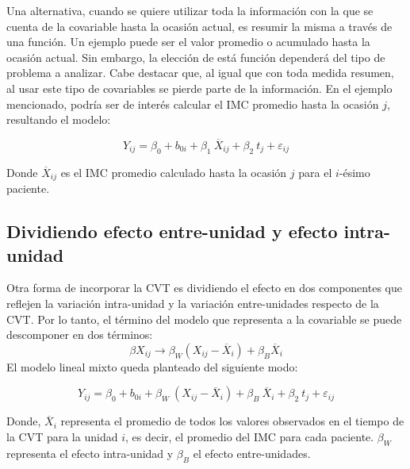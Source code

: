 \documentclass[spanish]{article}
\numberwithin{figure}{subsection}
\numberwithin{equation}{subsection}
\numberwithin{table}{subsection}
\begin{document}
Una alternativa, cuando se quiere utilizar toda la información con la que se
cuenta de la covariable hasta la ocasión actual, es resumir la misma a través de
una función. Un ejemplo puede ser el valor promedio o acumulado hasta la ocasión
actual. Sin embargo, la elección de está función dependerá del tipo de problema
a analizar. Cabe destacar que, al igual que con toda medida resumen, al usar
este tipo de covariables se pierde parte de la información. En el ejemplo
mencionado, podría ser de interés calcular el IMC promedio hasta la ocasión $j$,
resultando el modelo:

\[ Y_{ij} = \beta_0 + b_{0i} + \beta_1\ \overline{X}_{ij} + \beta_2\ t_j + \varepsilon_{ij} \]

Donde $\overline{X}_{ij}$ es el IMC promedio calculado hasta la ocasión $j$ para
el $i$-ésimo paciente.


\subsection{Dividiendo efecto entre-unidad y efecto intra-unidad}
\label{Dividiendo efecto entre-unidad y efecto intra-unidad}

Otra forma de incorporar la CVT es dividiendo el efecto en dos componentes que
reflejen la variación intra-unidad y la variación entre-unidades respecto de la
CVT. Por lo tanto, el término del modelo que representa a la covariable se puede
descomponer en dos términos:
\[ \beta X_{ij} \rightarrow \beta_W (X_{ij} - \overline{X}_i) + \beta_B \overline{X}_i \]
El modelo lineal mixto queda planteado del siguiente modo:

\[ 
	Y_{ij} = \beta_0 + b_{0i} + \beta_W\ (X_{ij} - \overline{X}_i) + \beta_B\ \overline{X}_i
	+ \beta_2\ t_j + \varepsilon_{ij}
\]

Donde, $\overline{X}_i$ representa el promedio de todos los valores observados
en el tiempo de la CVT para la unidad $i$, es decir, el promedio del IMC para
cada paciente. $\beta_W$ representa el efecto intra-unidad y $\beta_B$ el
efecto entre-unidades.

\end{document}
